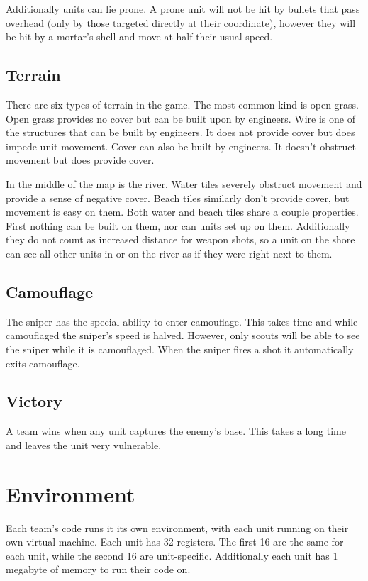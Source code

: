 \documentclass{article}
\begin{document}
Additionally units can lie prone. A prone unit will not be hit by bullets that
pass overhead (only by those targeted directly at their coordinate), however
they will be hit by a mortar's shell and move at half their usual speed.

\subsection{Terrain}

There are six types of terrain in the game. The most common kind is open grass.
Open grass provides no cover but can be built upon by engineers. Wire is one of
the structures that can be built by engineers. It does not provide cover but
does impede unit movement. Cover can also be built by engineers. It doesn't
obstruct movement but does provide cover.

In the middle of the map is the river. Water tiles severely obstruct movement
and provide a sense of negative cover. Beach tiles similarly don't provide
cover, but movement is easy on them. Both water and beach tiles share a couple
properties. First nothing can be built on them, nor can units set up on them.
Additionally they do not count as increased distance for weapon shots, so a unit
on the shore can see all other units in or on the river as if they were right
next to them.

\subsection{Camouflage}

The sniper has the special ability to enter camouflage. This takes time and
while camouflaged the sniper's speed is halved. However, only scouts will be
able to see the sniper while it is camouflaged. When the sniper fires a shot it
automatically exits camouflage.

\subsection{Victory}

A team wins when any unit captures the enemy's base. This takes a long time and
leaves the unit very vulnerable.

\section{Environment}

Each team's code runs it its own environment, with each unit running on their
own virtual machine. Each unit has 32 registers. The first 16 are the same for
each unit, while the second 16 are unit-specific. Additionally each unit has 1
megabyte of memory to run their code on.
\end{document}
